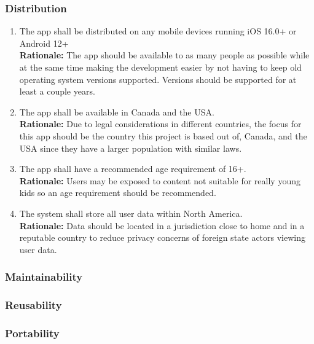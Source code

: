 \documentclass{article}
\begin{document}
\subsubsection{Distribution}
\label{ssub:distribution}


\begin{enumerate}[align=left, label=\textbf{DI-D\arabic*.}]
    \item The app shall be distributed on any mobile devices running iOS 16.0+ or Android 12+\\
          {\bf Rationale:} The app should be available to as many people as possible while at the same time making the development easier by not having to keep old operating system versions supported. Versions should be supported for at least a couple years.
    \item The app shall be available in Canada and the USA.\\
          {\bf Rationale:} Due to legal considerations in different countries, the focus for this app should be the country this project is based out of, Canada, and the USA since they have a larger population with similar laws.
    \item The app shall have a recommended age requirement of 16+.\\
          {\bf Rationale:} Users may be exposed to content not suitable for really young kids so an age requirement should be recommended.
    \item The system shall store all user data within North America.\\
          {\bf Rationale:} Data should be located in a jurisdiction close to home and in a reputable country to reduce privacy concerns of foreign state actors viewing user data.
\end{enumerate}

\subsubsection{Maintainability}


\subsubsection{Reusability}

\subsubsection{Portability}
\label{ssub:portability}
\end{document}
